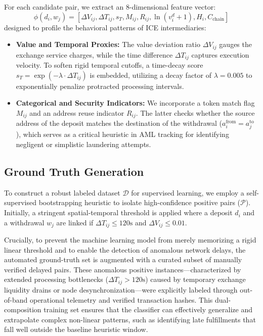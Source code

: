 \documentclass[journal]{IEEEtran}
\begin{document}
    For each candidate pair, we extract an 8-dimensional feature vector:
    \begin{equation}
    \phi(d_i, w_j) = \left[ \Delta V_{ij}, \Delta T_{ij}, s_T, M_{ij}, R_{ij}, \ln(v_i^d + 1), H_i, C_{\text{chain}} \right]
    \label{eq:feature_vector}
    \end{equation}
    designed to profile the behavioral patterns of ICE intermediaries:
    \begin{itemize}
        \item \textbf{Value and Temporal Proxies:} The value deviation ratio $\Delta V_{ij}$ gauges the exchange service charges, while the time difference $\Delta T_{ij}$ captures execution velocity. To soften rigid temporal cutoffs, a time-decay score $s_{T} = \exp(-\lambda \cdot \Delta T_{ij})$ is embedded, utilizing a decay factor of $\lambda = 0.005$ to exponentially penalize protracted processing intervals.
        \item \textbf{Categorical and Security Indicators:} We incorporate a token match flag $M_{ij}$ and an address reuse indicator $R_{ij}$. The latter checks whether the source address of the deposit matches the destination of the withdrawal ($a_{i}^{\text{from}} = a_{j}^{\text{to}}$), which serves as a critical heuristic in AML tracking for identifying negligent or simplistic laundering attempts.
    \end{itemize}
    \subsection{Ground Truth Generation}
    To construct a robust labeled dataset $\mathcal{D}$ for supervised learning, we employ a self-supervised bootstrapping heuristic to isolate high-confidence positive pairs ($\mathcal{P}$). Initially, a stringent spatial-temporal threshold is applied where a deposit $d_i$ and a withdrawal $w_j$ are linked if $\Delta T_{ij} \le 120\text{s}$ and $\Delta V_{ij} \le 0.01$. 
    
    Crucially, to prevent the machine learning model from merely memorizing a rigid linear threshold and to enable the detection of anomalous network delays, the automated ground-truth set is augmented with a curated subset of manually verified delayed pairs. These anomalous positive instances—characterized by extended processing bottlenecks ($\Delta T_{ij} > 120\text{s}$) caused by temporary exchange liquidity drains or node desynchronization—were explicitly labeled through out-of-band operational telemetry and verified transaction hashes. This dual-composition training set ensures that the classifier can effectively generalize and extrapolate complex non-linear patterns, such as identifying late fulfillments that fall well outside the baseline heuristic window.
    
\end{document}

